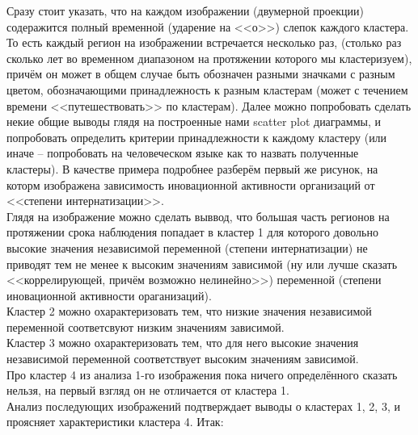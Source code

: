 \documentclass[11pt]{article}
\begin{document}
    Сразу стоит указать, что на каждом изображении (двумерной проекции)
содеражится полный временной (ударение на <<о>>) слепок каждого
кластера. То есть каждый регион на изображении встречается несколько
раз, (столько раз сколько лет во временном диапазоном на протяжении
которого мы кластеризуем), причём он может в общем случае быть обозначен
разными значками с разным цветом, обозначающими принадлежность к разным
кластерам (может с течением времени <<путешествовать>> по
кластерам). Далее можно попробовать сделать некие общие выводы глядя на
построенные нами scatter plot диаграммы, и попробовать определить
критерии принадлежности к каждому кластеру (или иначе -- попробовать на
человеческом языке как то назвать полученные кластеры). В качестве
примера подробнее разберём первый же рисунок, на которм изображена
зависимость иновационной активности организаций от
<<степени интернатизации>>. \\ Глядя на изображение
можно сделать выввод, что большая часть регионов на протяжении срока
наблюдения попадает в кластер 1 для которого довольно высокие значения
независимой переменной (степени интернатизации) не приводят тем не менее
к высоким значениям зависимой (ну или лучше сказать
<<коррелирующей, причём возможно нелинейно>>) переменной
(степени иновационной активности ораганизаций). \\ Кластер 2 можно
охарактеризовать тем, что низкие значения независимой переменной
соответсвуют низким значениям зависимой. \\ Кластер 3 можно
охарактеризовать тем, что для него высокие значения независимой
переменной соответствует высоким значениям зависимой.
\\ Про кластер 4 из анализа 1-го изображения пока ничего
определённого сказать нельзя, на первый взгляд он не отличается от
кластера 1. \\ Анализ последующих изображений подтверждает
выводы о кластерах 1, 2, 3, и проясняет характеристики кластера 4. Итак:
\end{document}
